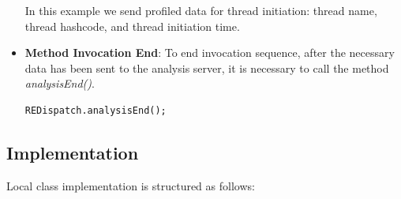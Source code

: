 \documentclass[]{usiinfthesis}
\begin{document}
\begin{itemize}
\vspace*{0.5cm}
    In this example we send profiled data for thread initiation: thread name, thread hashcode, and thread initiation time. 
    \item \textbf{Method Invocation End}: To end invocation sequence, after the necessary data has been sent to the analysis server, it is necessary to call the method \textit{analysisEnd()}.
    \vspace*{0.5cm}
    \begin{verbatim}
REDispatch.analysisEnd();
\end{verbatim}
\vspace*{0.5cm}
\end{itemize}

\subsection{Implementation}
Local class implementation is structured as follows:
\end{document}
